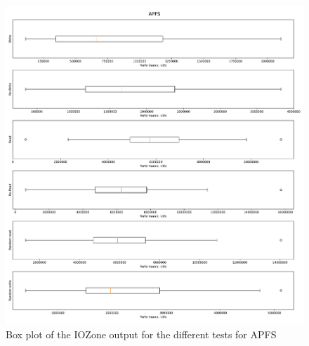 \begin{figure}[!htb]
	\label{fig:res_box_apfs}
	\begin{center}
		\includegraphics[width=1.0\textwidth]{figures/benchmarking/local/APFS-box.pdf}
	\end{center}
	\caption{Box plot of the IOZone output for the different tests for APFS}
\end{figure}